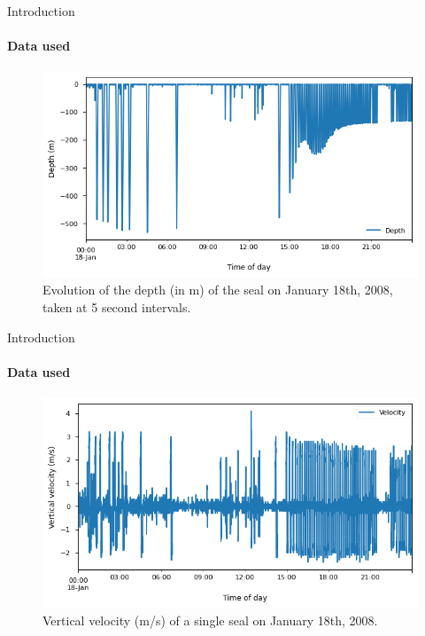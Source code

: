 \documentclass[dvipsnames, handout]{beamer}
\begin{document}
\begin{frame}{Introduction}
\framesubtitle{Data used}

\begin{figure}
    \centering
    \includegraphics[width=\linewidth]{depth_fig.png}
    \caption{Evolution of the depth (in m) of the seal on January 18th, 2008, taken at 5 second intervals.}
    \label{fig:depth}
\end{figure}
\end{frame}

\begin{frame}{Introduction}
\framesubtitle{Data used}
\begin{figure}
    \centering
    \includegraphics[width=\linewidth]{velocity_fig.png}
    \caption{Vertical velocity (m/s) of a single seal on January 18th, 2008.}
    \label{fig:velocity}
\end{figure}

\end{frame}
\end{document}
